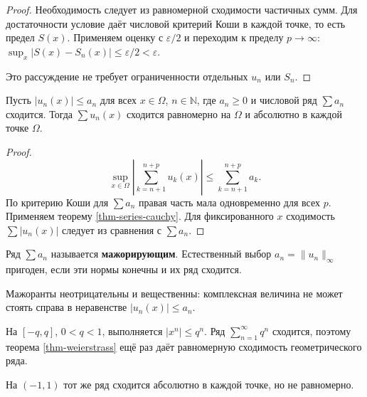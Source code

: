 \begin{proof}

Необходимость следует из равномерной сходимости частичных сумм. Для достаточности условие даёт числовой критерий Коши в каждой точке, то есть предел \(S(x)\). Применяем оценку с \(\varepsilon/2\) и переходим к пределу \(p\to\infty\): \(\sup_x|S(x)-S_n(x)|\le\varepsilon/2<\varepsilon\).

Это рассуждение не требует ограниченности отдельных \(u_n\) или \(S_n\).

\end{proof}

\begin{theorem}\label{thm-weierstrass}

Пусть \(|u_n(x)|\le a_n\) для всех \(x\in\Omega\), \(n\in\mathbb N\), где \(a_n\ge0\) и числовой ряд \(\sum a_n\) сходится. Тогда \(\sum u_n(x)\) сходится равномерно на \(\Omega\) и абсолютно в каждой точке \(\Omega\).

\end{theorem}

\begin{proof}

\[
\sup_{x\in\Omega}\left|\sum_{k=n+1}^{n+p}u_k(x)\right|
\le\sum_{k=n+1}^{n+p}a_k.
\] По критерию Коши для \(\sum a_n\) правая часть мала одновременно для всех \(p\). Применяем теорему \ref{thm-series-cauchy}. Для фиксированного \(x\) сходимость \(\sum|u_n(x)|\) следует из сравнения с \(\sum a_n\).

\end{proof}

Ряд \(\sum a_n\) называется \textbf{мажорирующим}. Естественный выбор \(a_n=\lVert u_n\rVert_\infty\) пригоден, если эти нормы конечны и их ряд сходится.

Мажоранты неотрицательны и вещественны: комплексная величина не может стоять справа в неравенстве \(|u_n(x)|\le a_n\).

\begin{example}\label{exm-weierstrass-geometric}

На \([-q,q]\), \(0<q<1\), выполняется \(|x^n|\le q^n\). Ряд \(\sum_{n=1}^\infty q^n\) сходится, поэтому теорема \ref{thm-weierstrass} ещё раз даёт равномерную сходимость геометрического ряда.

На \((-1,1)\) тот же ряд сходится абсолютно в каждой точке, но не равномерно.

\end{example}

